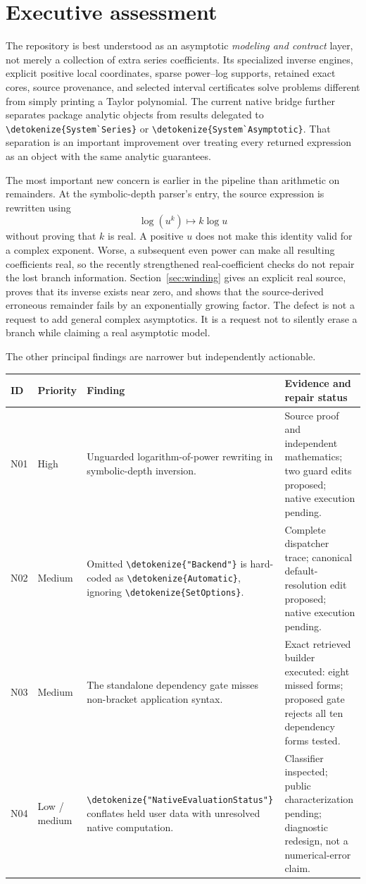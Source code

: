 \documentclass[11pt,a4paper]{article}
\newcommand{\wl}[1]{\texttt{\expandafter\nolinkurl\expandafter{\detokenize{#1}}}}
\begin{document}
\section{Executive assessment}

The repository is best understood as an asymptotic \emph{modeling and contract}
layer, not merely a collection of extra series coefficients. Its specialized
inverse engines, explicit positive local coordinates, sparse power--log supports,
retained exact cores, source provenance, and selected interval certificates solve
problems different from simply printing a Taylor polynomial. The current native
bridge further separates package analytic objects from results delegated to
\wl{System`Series} or \wl{System`Asymptotic}. That separation is an important
improvement over treating every returned expression as an object with the same
analytic guarantees.\cite{readme,core,native,nativedoc}

The most important new concern is earlier in the pipeline than arithmetic on
remainders. At the symbolic-depth parser's entry, the source expression is
rewritten using
\[
 \log(u^k)\longmapsto k\log u
\]
without proving that $k$ is real. A positive $u$ does not make this identity valid
for a complex exponent. Worse, a subsequent even power can make all resulting
coefficients real, so the recently strengthened real-coefficient checks do not
repair the lost branch information. Section~\ref{sec:winding} gives an explicit
real source, proves that its inverse exists near zero, and shows that the
source-derived erroneous remainder fails by an exponentially growing factor.
The defect is not a request to add general complex asymptotics. It is a request
not to silently erase a branch while claiming a real asymptotic model.\cite{core}

The other principal findings are narrower but independently actionable.

\begin{longtable}{@{}p{}p{}p{}p{}@{}}
\toprule
ID & Priority & Finding & Evidence and repair status\\
\midrule
\endhead
N01 & High & Unguarded logarithm-of-power rewriting in symbolic-depth inversion. & Source proof and independent mathematics; two guard edits proposed; native execution pending.\\[4pt]
N02 & Medium & Omitted \wl{"Backend"} is hard-coded as \wl{Automatic}, ignoring \wl{SetOptions}. & Complete dispatcher trace; canonical default-resolution edit proposed; native execution pending.\\[4pt]
N03 & Medium & The standalone dependency gate misses non-bracket application syntax. & Exact retrieved builder executed: eight missed forms; proposed gate rejects all ten dependency forms tested.\\[4pt]
N04 & Low / medium & \wl{"NativeEvaluationStatus"} conflates held user data with unresolved native computation. & Classifier inspected; public characterization pending; diagnostic redesign, not a numerical-error claim.\\
\bottomrule
\end{longtable}
\end{document}
